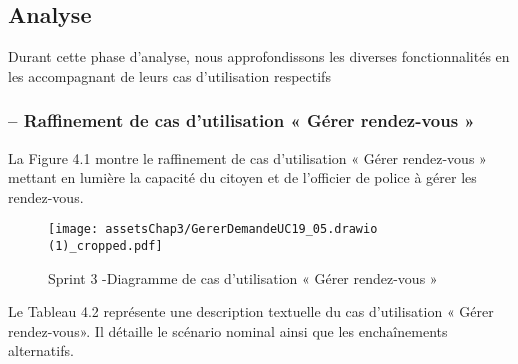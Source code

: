 \subsection{Analyse}
Durant cette phase d’analyse, nous approfondissons les diverses fonctionnalités en les accompagnant de leurs cas d’utilisation respectifs


\subsubsection{– Raffinement de cas d’utilisation « Gérer rendez-vous  »
}
La Figure 4.1 montre le raffinement de cas d’utilisation « Gérer rendez-vous  » mettant en lumière la capacité du citoyen et de l'officier de police à gérer les rendez-vous.
\begin{figure}[H]
\centering
\texttt{[image: assetsChap3/GererDemandeUC19\_05.drawio (1)\_cropped.pdf]}
\caption{ Sprint 3 -Diagramme de cas d’utilisation « Gérer rendez-vous » }
\end{figure}

Le Tableau 4.2 représente une description textuelle du cas d’utilisation « Gérer rendez-vous». Il
détaille le scénario nominal ainsi que les enchaînements alternatifs.


